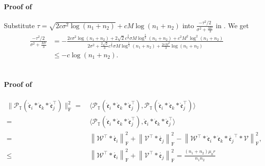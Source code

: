 \documentclass[twoside,12pt]{article}
\def\fro{{\mathrm{F}}}
\def\fro{{\mathrm{F}}}
\def\dme{{\dot{\mathfrak{e}}}}
\def\mrme{{\mathring{\mathfrak{e}}}}
\begin{document}
\paragraph{Proof of }
    Substitute $\tau =  \sqrt{2c \sigma^2 \log \left(n_1+n_2\right)}+c M\log \left(n_1+n_2\right)$ into $\frac{-\tau^2/2}{\sigma^2+\frac{M\tau}{3}}$ in . We  get
    \begin{align*}
  \frac{-\tau^2/2}{\sigma^2+\frac{M\tau}{3}} &=-\frac{2c\sigma^{2}\log(n_1+n_2)+2\sqrt{2}c^{\frac{3}{2}}\sigma M\log^{\frac{3}{2}}(n_1+n_2)  +c^{2}M^{2}\log^2(n_1+n_2)}{2\sigma^2+\frac{2\sqrt{2}}{3}c^{\frac{1}{2}} \sigma M  \log^{\frac{1}{2}}\left(n_1+n_2\right)+\frac{2cM^2}{3}\log \left(n_1+n_2\right)}\\
  &\leq  -c\log(n_1+n_2).
    \end{align*}
\hfill\BlackBox\\[2mm]
\vspace{-25pt}
\paragraph{Proof of }
\begin{align*}
\|\mathcal{P}_{\mathbb{T}}(\mrme_i * \dme_k * \mrme_j^{\top})\|_{\fro}^2   = &~\langle\mathcal{P}_{\mathbb{T}}(\mrme_i * \dme_k * \mrme_j^{\top}),\mathcal{P}_{\mathbb{T}}(\mrme_i * \dme_k * \mrme_j^{\top}) \rangle \\
=&~\langle\mathcal{P}_{\mathbb{T}}(\mrme_i * \dme_k * \mrme_j^{\top}),\mrme_i * \dme_k * \mrme_j^{\top}\rangle \\
=&~ \left\|\mathcal{W}^{\top} * \mathring{\mathfrak{e}_i}\right\|_{\fro}^2+\left\|\mathcal{V}^{\top} * \mathring{\mathfrak{e}_j}\right\|_{\fro}^2-\left\|\mathcal{W}^{\top} * \mrme_i * \dme_k * \mathring{\mathfrak{e}_j}^{\top} * \mathcal{V}\right\|_{\fro}^2, \\
 \leq  &~  \left\|\mathcal{W}^{\top} * \mathring{\mathfrak{e}_i}\right\|_{\fro}^2+\left\|\mathcal{V}^{\top} * \mathring{\mathfrak{e}_j}\right\|_{\fro}^2 
=\frac{(n_1+n_2)\mu_{0}r}{n_{1}n_{2}} 
\end{align*}
\hfill\BlackBox\\[2mm]
\end{document}
